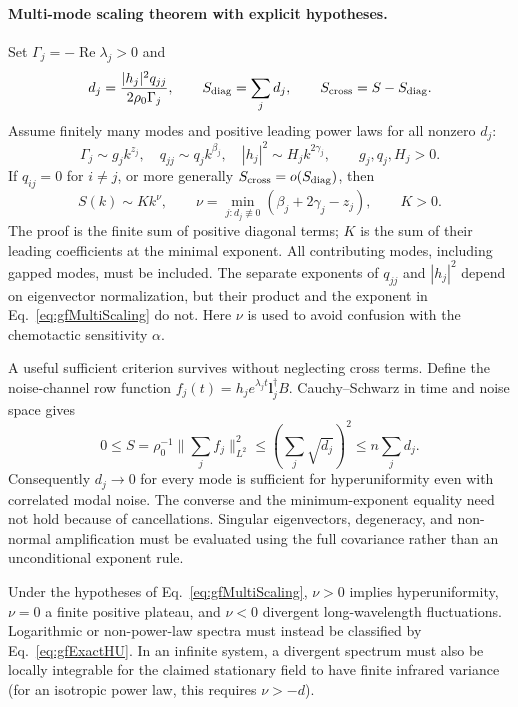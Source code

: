\documentclass{article}
\begin{document}
\paragraph{Multi-mode scaling theorem with explicit hypotheses.}
Set $\Gamma_j=-\operatorname{Re}\lambda_j>0$ and
\begin{equation}
    d_j=\frac{|h_j|^2q_{jj}}{2\rho_0\Gamma_j},\qquad
    S_{\rm diag}=\sum_j d_j,\qquad S_{\rm cross}=S-S_{\rm diag}.
\end{equation}
Assume finitely many modes and positive leading power laws for all nonzero $d_j$:
\begin{equation}
    \Gamma_j\sim g_jk^{z_j},\quad q_{jj}\sim q_jk^{\beta_j},\quad
    |h_j|^2\sim H_jk^{2\gamma_j},\qquad g_j,q_j,H_j>0.
\end{equation}
If $q_{ij}=0$ for $i\ne j$, or more generally $S_{\rm cross}=o(S_{\rm diag})$, then
\begin{equation}
    \boxed{S(k)\sim K k^\nu,\qquad
    \nu=\min_{j:d_j\not\equiv0}(\beta_j+2\gamma_j-z_j),\qquad K>0.}
    \label{eq:gfMultiScaling}
\end{equation}
The proof is the finite sum of positive diagonal terms; $K$ is the sum of their leading coefficients at the minimal exponent. All contributing modes, including gapped modes, must be included. The separate exponents of $q_{jj}$ and $|h_j|^2$ depend on eigenvector normalization, but their product and the exponent in Eq.~\eqref{eq:gfMultiScaling} do not. Here $\nu$ is used to avoid confusion with the chemotactic sensitivity $\alpha$.

A useful sufficient criterion survives without neglecting cross terms. Define the noise-channel row function $f_j(t)=h_j e^{\lambda_jt}\mathbf l_j^\dagger B$. Cauchy--Schwarz in time and noise space gives
\begin{equation}
    0\le S=\rho_0^{-1}\|\sum_j f_j\|_{L^2}^2
    \le\left(\sum_j\sqrt{d_j}\right)^2\le n\sum_j d_j.
    \label{eq:gfModeBound}
\end{equation}
Consequently $d_j\to0$ for every mode is sufficient for hyperuniformity even with correlated modal noise. The converse and the minimum-exponent equality need not hold because of cancellations. Singular eigenvectors, degeneracy, and non-normal amplification must be evaluated using the full covariance rather than an unconditional exponent rule.

Under the hypotheses of Eq.~\eqref{eq:gfMultiScaling}, $\nu>0$ implies hyperuniformity, $\nu=0$ a finite positive plateau, and $\nu<0$ divergent long-wavelength fluctuations. Logarithmic or non-power-law spectra must instead be classified by Eq.~\eqref{eq:gfExactHU}. In an infinite system, a divergent spectrum must also be locally integrable for the claimed stationary field to have finite infrared variance (for an isotropic power law, this requires $\nu>-d$).
\end{document}

